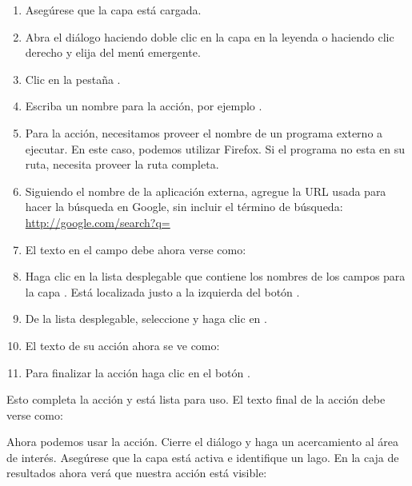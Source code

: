 \begin{enumerate}
\item Aseg\'urese que la capa  est\'a cargada.
\item Abra el di\'alogo  haciendo doble clic en la capa en la
  leyenda o haciendo clic derecho y elija  del men\'u emergente.
\item Clic en la pesta\~na .
\item Escriba un nombre para la acci\'on, por ejemplo .
\item Para la acci\'on, necesitamos proveer el nombre de un programa externo a
  ejecutar. En este caso, podemos utilizar Firefox. Si el programa no esta en
  su ruta, necesita proveer la ruta completa.
\item Siguiendo el nombre de la aplicaci\'on externa, agregue la URL usada para
  hacer la b\'usqueda en Google, sin incluir el t\'ermino de b\'usqueda:
  \url{http://google.com/search?q=}
\item El texto en el campo  debe ahora verse como:\\
\item Haga clic en la lista desplegable que contiene los nombres de los campos para la
  capa . Est\'a localizada justo a la izquierda del
  bot\'on .
\item De la lista desplegable, seleccione  y haga clic en .
\item El texto de su acci\'on ahora se ve como:\\ 
\item Para finalizar la acci\'on haga clic en el bot\'on .
\end{enumerate}
 
Esto completa la acci\'on y est\'a lista para uso. El texto final de la acci\'on
debe verse como:

\begin{center}
\end{center}

Ahora podemos usar la acci\'on. Cierre el di\'alogo  y haga un acercamiento al \'area
de inter\'es. Aseg\'urese que la capa  est\'a activa e identifique un
lago. En la caja de resultados ahora ver\'a que nuestra acci\'on est\'a visible:

